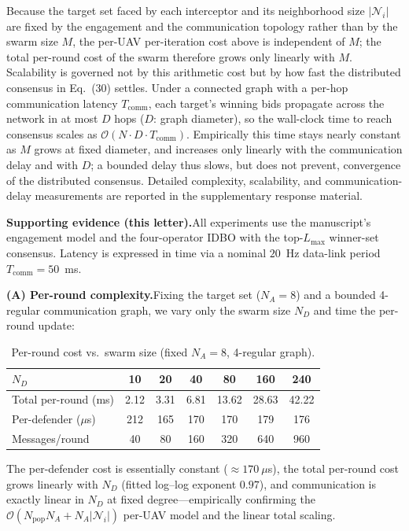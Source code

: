 \documentclass[11pt]{article}
\newcommand{\evi}{\medskip\noindent\textbf{Supporting evidence (this letter).}\quad}
\begin{document}
\begin{manuscripttext}
Because the target set faced by each interceptor and its neighborhood size
$\lvert\mathcal{N}_i\rvert$ are fixed by the engagement and the communication
topology rather than by the swarm size $M$, the per-UAV per-iteration cost above is
independent of $M$; the total per-round cost of the swarm therefore grows only
linearly with $M$. Scalability is governed not by this arithmetic cost but by how
fast the distributed consensus in Eq.~(30) settles. Under a connected graph with a
per-hop communication latency $T_{\mathrm{comm}}$, each target's winning bids
propagate across the network in at most $D$ hops ($D$: graph diameter), so the
wall-clock time to reach consensus scales as
$\mathcal{O}(N\!\cdot\!D\!\cdot\!T_{\mathrm{comm}})$. Empirically this time stays
nearly constant as $M$ grows at fixed diameter, and increases only linearly with
the communication delay and with $D$; a bounded delay thus slows, but does not
prevent, convergence of the distributed consensus. Detailed complexity,
scalability, and communication-delay measurements are reported in the supplementary
response material.
\end{manuscripttext}

\evi All experiments use the manuscript's engagement model and the four-operator
IDBO with the top-$L_{\max}$ winner-set consensus. Latency is expressed in time via
a nominal $20$~Hz data-link period $T_{\mathrm{comm}}=50$~ms.

\medskip
\noindent\textbf{(A) Per-round complexity.}\quad Fixing the target set ($N_A=8$)
and a bounded 4-regular communication graph, we vary only the swarm size $N_D$ and
time the per-round update:

\begin{table}[h]
\centering
\captionsetup{font=small}
\caption*{\small Per-round cost vs.\ swarm size (fixed $N_A=8$, 4-regular graph).}
\begin{tabular}{lcccccc}
\toprule
$N_D$ & 10 & 20 & 40 & 80 & 160 & 240 \\
\midrule
Total per-round (ms) & 2.12 & 3.31 & 6.81 & 13.62 & 28.63 & 42.22 \\
Per-defender ($\mu$s) & 212 & 165 & 170 & 170 & 179 & 176 \\
Messages/round & 40 & 80 & 160 & 320 & 640 & 960 \\
\bottomrule
\end{tabular}
\end{table}

\noindent The per-defender cost is essentially constant ($\approx170~\mu$s), the
total per-round cost grows linearly with $N_D$ (fitted log--log exponent $0.97$),
and communication is exactly linear in $N_D$ at fixed degree---empirically
confirming the $\mathcal{O}(N_{\mathrm{pop}}N_A+N_A\lvert\mathcal{N}_i\rvert)$
per-UAV model and the linear total scaling.
\end{document}
